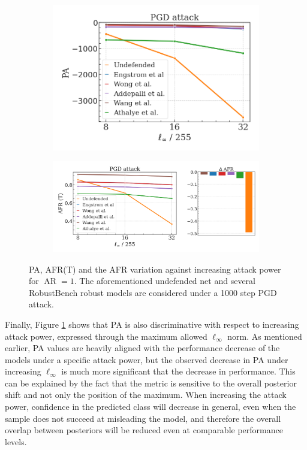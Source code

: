 \begin{figure}[H]
    \centering
    \begin{subfigure}[b]{0.37\textwidth}
        \centering
        \includegraphics[width=\textwidth]{img/results_discussion/adversarial/PGD_logPA_eps.png}
    \end{subfigure}
    \hfill
    \begin{subfigure}[b]{0.59\textwidth}
        \centering
        \includegraphics[width=\textwidth]{img/results_discussion/adversarial/PGD_AFR_true_eps_diff.png}
    \end{subfigure}
    \caption{PA, AFR(T) and the AFR variation against increasing attack power for  $\operatorname{AR} = 1$. 
    The aforementioned undefended net and several RobustBench robust models are considered
    under a 1000 step PGD attack.}
    \label{fig:pgd_eps}
\end{figure}

Finally, Figure \ref{fig:pgd_eps} shows that PA is also discriminative with respect to
increasing attack power, expressed through the maximum allowed $\ell_\infty$ norm. 
As mentioned earlier, PA values are heavily aligned with the performance
decrease of the models under a specific attack power, but the observed decrease in PA 
under increasing $\ell_\infty$ is much more significant that the decrease 
in performance. This can be explained by the fact that the metric is sensitive 
to the overall posterior shift and not only the position of the maximum. When increasing 
the attack power, confidence in the predicted class will decrease in general, 
even when the sample does not succeed at misleading the model, and therefore the
overall overlap between posteriors will be reduced even at comparable performance levels. \\

